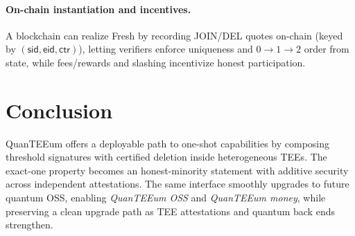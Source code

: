 \documentclass[runningheads,orivec]{llncs}
\newcommand{\prot}{\textsf{QuanTEEum}}
\newcommand{\sid}{\mathsf{sid}}
\begin{document}

\paragraph{On-chain instantiation and incentives.}
A blockchain can realize \textsf{Fresh} by recording JOIN/DEL quotes on-chain (keyed by $(\sid,\mathsf{eid},\mathsf{ctr})$), letting verifiers enforce uniqueness and $0\!\rightarrow\!1\!\rightarrow\!2$ order from state, while fees/rewards and slashing incentivize honest participation.

\section{Conclusion}
\prot{} offers a deployable path to one-shot capabilities by composing threshold signatures with certified deletion inside heterogeneous TEEs. The exact-one property becomes an honest-minority statement with additive security across independent attestations. The same interface smoothly upgrades to future quantum OSS, enabling \emph{QuanTEEum OSS} and \emph{QuanTEEum money}, while preserving a clean upgrade path as TEE attestations and quantum back ends strengthen.



\end{document}
